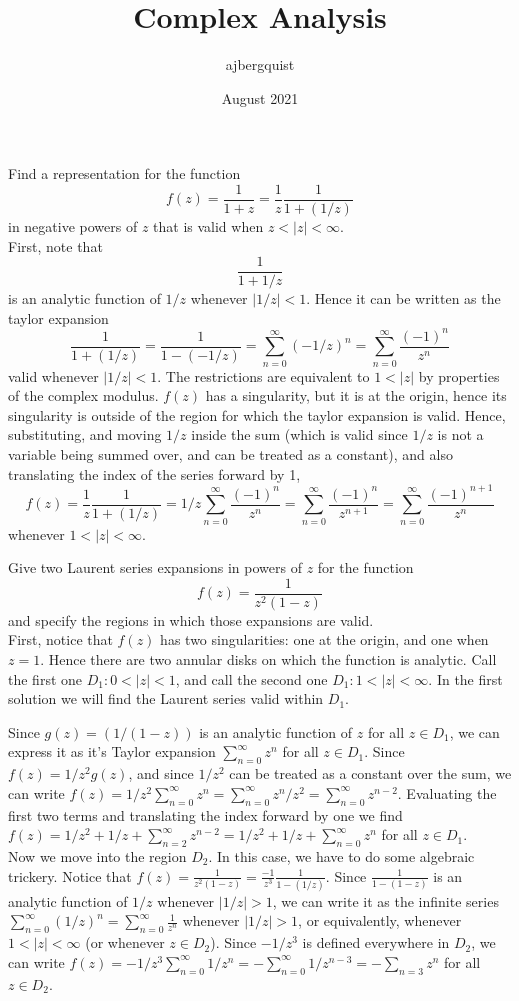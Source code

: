 \documentclass{article}
\title{Complex Analysis}
\author{ajbergquist }
\date{August 2021}
\theoremstyle{definition}
\newcommand{\infsum}{\sum_{n = 0}^{\infty}}
\newcommand{\cs}[1]{\color{blue}{#1}\normalcolor}
\begin{document}
 Find a representation for the function $$
f(z) = \frac{1}{1+z} = \frac{1}{z}\frac{1}{1+(1/z)}$$ in negative powers of $z$ that is valid when $z < |z| < \infty$.\\

 First, note that $$\frac{1}{1+1/z}$$ is an analytic function of $1/z$ whenever $|1/z| < 1$. Hence it can be written as the taylor expansion 
$$\frac{1}{1+(1/z)} = \frac{1}{1-(-1/z)} = \infsum (-1/z)^n = \infsum \frac{(-1)^n}{z^n}$$ valid whenever $|1/z| < 1$. The restrictions are equivalent to $1 < |z|$ by properties of the complex modulus. $f(z)$ has a singularity, but it is at the origin, hence its singularity is outside of the region for which the taylor expansion is valid. Hence, substituting, and moving $1/z$ inside the sum (which is valid since $1/z$ is not a variable being summed over, and can be treated as a constant), and also translating the index of the series forward by 1,
$$f(z) = \frac{1}{z}\frac{1}{1+(1/z)} = 1/z\infsum \frac{(-1)^n}{z^n} = \infsum \frac{(-1)^n}{z^{n+1}}  = \sum_{n=0}^\infty\frac{(-1)^{n+1}}{z^n}$$  whenever $1< |z| < \infty$.\\

\cs{5/5}

 Give two Laurent series expansions in powers of $z$ for the function $$
f(z) = \frac{1}{z^2(1-z)}$$ and specify the regions in which those expansions are valid.\\

 First, notice that $f(z)$ has two singularities: one at the origin, and one when $z = 1$. Hence there are two annular disks on which the function is analytic. Call the first one $D_1 : 0 < |z| < 1$, and call the second one $D_1: 1 < |z| < \infty$. In the first solution we will find the Laurent series valid within $D_1$.\\ \cs{Which $D_1$?}

Since $g(z) = (1/(1-z))$ is an analytic function of $z$ for all $z\in D_1$, we can express it as it's Taylor expansion $\infsum z^n$ for all $z\in D_1$. Since $f(z) = 1/z^2g(z)$, and since $1/z^2$ can be treated as a constant over the sum, we can write $f(z) = 1/z^2\infsum z^n = \infsum z^n/z^2 = \infsum z^{n-2}$. Evaluating the first two terms and translating the index forward by one we find $f(z) = 1/z^2 + 1/z + \sum_{n = 2}^\infty z^{n-2} = 1/z^2 + 1/z + \infsum z^n$ for all $z\in D_1$.\\

 Now we move into the region $D_2$. In this case, we have to do some algebraic trickery. Notice that $f(z) = \frac{1}{z^2(1-z)} = \frac{-1}{z^3}\frac{1}{1-(1/z)}.$ Since $\frac{1}{1-(1-z)}$ \cs{Check that.} is an analytic function of $1/z$ whenever $|1/z| > 1$, we can write it as the infinite series $\infsum (1/z)^n = \infsum \frac{1}{z^n}$ whenever $|1/z| > 1$, or equivalently, whenever $1 < |z|< \infty$ (or whenever $z\in D_2$). Since $-1/z^3$ is defined everywhere in $D_2$, we can write $f(z) = -1/z^3\infsum 1/z^n = -\infsum 1/z^{n-3} = -\sum_{n = 3}z^n$ for all $z\in D_2$.

\cs{10/10}

\cs{15/15}
\end{document}
